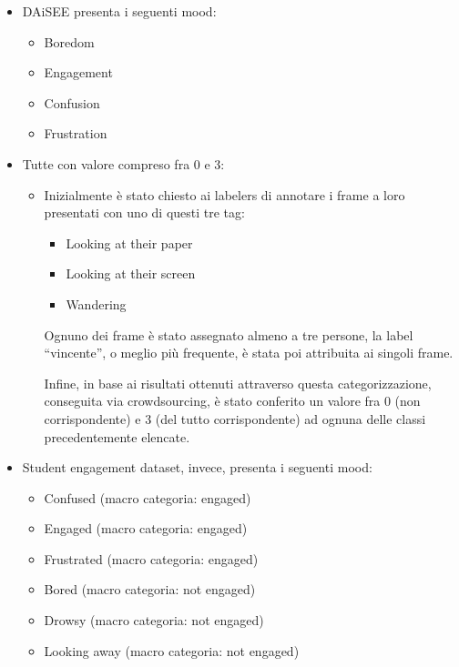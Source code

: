 \begin{itemize}
    \item DAiSEE presenta i seguenti mood:
    \begin{itemize}
        \item Boredom
        \item Engagement
        \item Confusion
        \item Frustration
    \end{itemize}
    \item Tutte con valore compreso fra 0 e 3:
    \begin{itemize}
        \item Inizialmente è stato chiesto ai labelers di annotare i frame a loro presentati con uno di questi tre tag:
        \begin{itemize}
            \item Looking at their paper
            \item Looking at their screen
            \item Wandering
        \end{itemize}
            
        Ognuno dei frame è stato assegnato almeno a tre persone, la label “vincente”, o meglio più frequente, è stata poi attribuita ai singoli frame.

        Infine, in base ai risultati ottenuti attraverso questa categorizzazione, conseguita via crowdsourcing, è stato conferito un valore fra 0 (non corrispondente) e 3 (del tutto corrispondente) ad ognuna delle classi precedentemente elencate.
    \end{itemize}
    \item Student engagement dataset, invece, presenta i seguenti mood:
    \begin{itemize}
        \item Confused (macro categoria: engaged)
        \item Engaged (macro categoria: engaged)
        \item Frustrated (macro categoria: engaged)
        \item Bored (macro categoria: not engaged)
        \item Drowsy (macro categoria: not engaged)
        \item Looking away (macro categoria: not engaged)
    \end{itemize}
\end{itemize}

